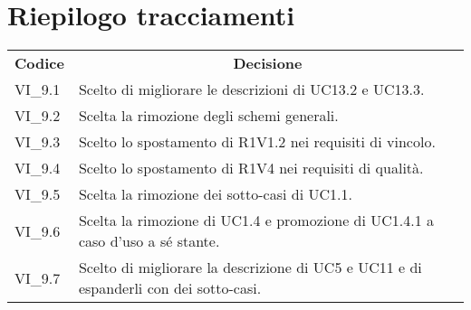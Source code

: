 
\section{Riepilogo tracciamenti}
\begin{longtable} {
		>{\centering}p{17mm} 
		>{}p{120mm}}
	\rowcolor{gray!50}
	\textbf{Codice} & \multicolumn{1}{c}{\textbf{Decisione}} \\%
	VI\_9.1 & Scelto di migliorare le descrizioni di UC13.2 e UC13.3. \TBstrut \\ [2mm]
	VI\_9.2 & Scelta la rimozione degli schemi generali. \TBstrut \\ [2mm]
	VI\_9.3 & Scelto lo spostamento di R1V1.2 nei requisiti di vincolo. \TBstrut \\ [2mm]
	VI\_9.4 & Scelto lo spostamento di R1V4 nei requisiti di qualità. \TBstrut \\ [2mm]
	VI\_9.5 & Scelta la rimozione dei sotto-casi di UC1.1. \TBstrut \\ [2mm]
	VI\_9.6 & Scelta la rimozione  di UC1.4 e promozione di UC1.4.1 a caso d'uso a sé stante. \TBstrut \\ [2mm]
	VI\_9.7 & Scelto di migliorare la descrizione di UC5 e UC11 e di espanderli con dei sotto-casi. \TBstrut \\ [2mm]
	
\end{longtable}